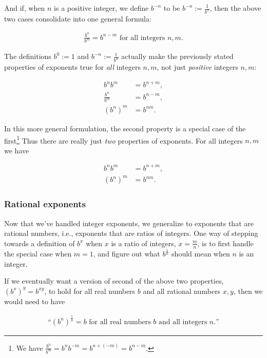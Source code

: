 And if, when $n$ is a positive integer, we define $b^{-n}$ to be $b^{-n} := \frac{1}{b^n}$, then the above two cases consolidate into one general formula:

\begin{align*}
    \frac{b^n}{b^m} = b^{n - m} \text{ for all integers $n, m$}.
\end{align*}

The definitions $b^0 := 1$ and $b^{-n} := \frac{1}{b^n}$ actually make the previously stated properties of exponents true for \textit{all} integers $n, m$, not just \textit{positive} integers $n, m$:

\begin{align*}
    b^n b^m &= b^{n + m}, \\
    \frac{b^n}{b^m} &= b^{n - m}, \\
    (b^n)^m &= b^{nm}.
\end{align*}

In this more general formulation, the second property is a special case of the first\footnote{We have $\frac{b^n}{b^m} = b^n b^{-m} = b^{n + (-m)} = b^{n - m}$.} Thus there are really just \textit{two} properties of exponents. For all integers $n, m$ we have

\begin{align*}
    b^n b^m &= b^{n + m}, \\
    (b^n)^m &= b^{nm}.
\end{align*}

\subsubsection*{Rational exponents}

Now that we've handled integer exponents, we generalize to exponents that are rational numbers, i.e., exponents that are ratios of integers. One way of stepping towards a definition of $b^x$ when $x$ is a ratio of integers, $x = \frac{m}{n}$, is to first handle the special case when $m = 1$, and figure out what $b^{\frac{1}{n}}$ should mean when $n$ is an integer.

If we eventually want a version of second of the above two properties, $(b^x)^y = b^{xy}$, to hold for all real numbers $b$ and all rational numbers $x, y$, then we would need to have

\begin{align*}
    \text{``}(b^n)^{\frac{1}{n}} = b \text{ for all real numbers $b$ and all integers $n$}.\text{''}
\end{align*}


